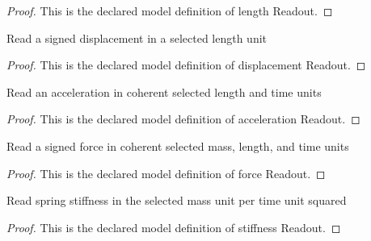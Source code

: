 \begin{proof}
  This is the declared model definition of length Readout.
\end{proof}
\begin{definition}
  \label{def:physics:phyx-mini-0203:phyxminiproblems-problemphyxmini0203-displacementreadout}
  Read a signed displacement in a selected length unit
\end{definition}
\begin{proof}
  This is the declared model definition of displacement Readout.
\end{proof}
\begin{definition}
  \label{def:physics:phyx-mini-0203:phyxminiproblems-problemphyxmini0203-accelerationreadout}
  Read an acceleration in coherent selected length and time units
\end{definition}
\begin{proof}
  This is the declared model definition of acceleration Readout.
\end{proof}
\begin{definition}
  \label{def:physics:phyx-mini-0203:phyxminiproblems-problemphyxmini0203-forcereadout}
  Read a signed force in coherent selected mass, length, and time units
\end{definition}
\begin{proof}
  This is the declared model definition of force Readout.
\end{proof}
\begin{definition}
  \label{def:physics:phyx-mini-0203:phyxminiproblems-problemphyxmini0203-stiffnessreadout}
  Read spring stiffness in the selected mass unit per time unit squared
\end{definition}
\begin{proof}
  This is the declared model definition of stiffness Readout.
\end{proof}
